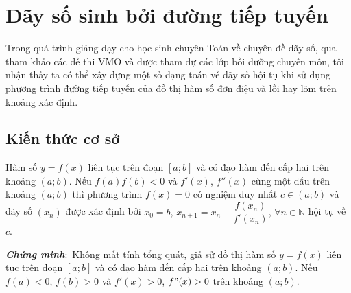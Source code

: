 \section{Dãy số sinh bởi đường tiếp tuyến}
\begin{center}
	\textbf{\color{violet}{Trương Ngọc Đắc-Trường THPT Chuyên Lê Quý Đôn, Bình Định}}
\end{center}
\noindent Trong quá trình giảng dạy cho học sinh chuyên Toán về chuyên đề dãy số, qua tham khảo các đề thi VMO và được tham dự các lớp bồi dưỡng chuyên môn, tôi nhận thấy ta có thể xây dựng một số dạng toán về dãy số hội tụ khi sử dụng phương trình đường tiếp
tuyến của đồ thị hàm số đơn điệu và lồi hay lõm trên khoảng xác định.

\subsection{Kiến thức cơ sở}
\begin{dl}
Hàm số $y=f(x)$ liên tục trên đoạn $[a;b]$ và có đạo hàm đến cấp hai trên khoảng $(a;b)$. Nếu $f(a)f(b)<0$ và $f'(x)$, $f''(x)$ cùng một dấu trên khoảng $(a;b)$ thì phương trình $f(x)=0$ có nghiệm duy nhất $c\in (a;b)$ và dãy số $(x_n)$ được xác định bởi $x_0 =b, \, x_{n+1}=x_n -\dfrac{f(x_n)}{f'(x_n)}, \, \forall n\in \mathbb{N}$ hội tụ về $c$.
\end{dl}
\textbf{\textit{Chứng minh$\colon$}}
Không mất tính tổng quát, giả sử đồ thị hàm số $y=f(x)$ liên tục trên đoạn $[a;b]$ và có đạo hàm đến cấp hai trên khoảng $(a;b)$. Nếu $f(a)<0$, $f(b)>0$ và $f'(x) >0$, $f"(x)>0$ trên khoảng $(a;b)$.
